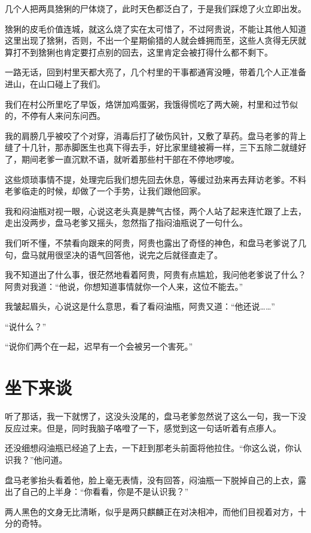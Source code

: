 几个人把两具猞猁的尸体烧了，此时天色都泛白了，于是我们踩熄了火立即出发。

猞猁的皮毛价值连城，就这么烧了实在太可惜了，不过阿贵说，不能让其他人知道这里出现了猞猁，否则，不出一个星期偷猎的人就会蜂拥而至，这些人贪得无厌就算打不到猞猁也肯定要打点别的回去，这里肯定会被打得什么都不剩下。

一路无话，回到村里天都大亮了，几个村里的干事都通宵没睡，带着几个人正准备进山，在山口碰上了我们。

我们在村公所里吃了早饭，烙饼加鸡蛋粥，我饿得慌吃了两大碗，村里和过节似的，不停有人来问东问西。

我的肩膀几乎被咬了个对穿，消毒后打了破伤风针，又敷了草药。盘马老爹的背上缝了十几针，那赤脚医生也真下得去手，好比家里缝被褥一样，三下五除二就缝好了，期间老爹一直沉默不语，就听着那些村干部在不停地啰唆。

这些烦琐事情不提，处理完后我们想先回去休息，等缓过劲来再去拜访老爹。不料老爹临走的时候，却做了一个手势，让我们跟他回家。

我和闷油瓶对视一眼，心说这老头真是脾气古怪，两个人站了起来连忙跟了上去，走出没两步，盘马老爹又摇头，忽然指了指闷油瓶说了一句什么。

我们听不懂，不禁看向跟来的阿贵，阿贵也露出了奇怪的神色，和盘马老爹说了几句，盘马就用很坚决的语气回答他，说完之后就径直走了。

我不知道出了什么事，很茫然地看着阿贵，阿贵有点尴尬，我问他老爹说了什么？阿贵对我道：“他说，你想知道事情就你一个人来，这位不能去。”

我皱起眉头，心说这是什么意思，看了看闷油瓶，阿贵又道：“他还说……”

“说什么？”

“说你们两个在一起，迟早有一个会被另一个害死。”

\chapter{坐下来谈}

听了那话，我一下就愣了，这没头没尾的，盘马老爹忽然说了这么一句，我一下没反应过来。但是，同时我脑子咯噔了一下，感觉到这一句话听着有点瘆人。

还没细想闷油瓶已经追了上去，一下赶到那老头前面将他拉住。“你这么说，你认识我？”他问道。

盘马老爹抬头看着他，脸上毫无表情，没有回答，闷油瓶一下脱掉自己的上衣，露出了自己的上半身：“你看看，你是不是认识我？”

两人黑色的文身无比清晰，似乎是两只麒麟正在对决相冲，而他们目视着对方，十分的奇特。

